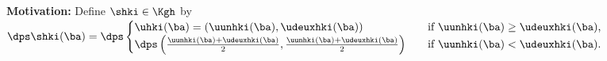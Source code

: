 \documentclass[10 pt]{beamer}
\begin{document}
\begin{frame}
\begin{figure}[H]
\begin{subfigure}[normal]{0.35\textwidth}
\label{ref:lambda_membrane_inside_iter} 
\end{subfigure}
\end{figure}
\vspace{-0.2 cm}
\textcolor{cadmiumgreen}{\textbf{Motivation:}} Define $\shki \in \Kgh$ by
\vspace{0.3 cm}
$\dps \shki (\ba)= \dps \begin{cases}
\uhki(\ba) = \left(\uunhki(\ba), \udeuxhki(\ba)\right) \quad &\mbox{if $\uunhki(\ba) \geq \udeuxhki(\ba)$,}\\
\dps \left(\frac{\uunhki(\ba) + \udeuxhki(\ba)}{2}, \frac{\uunhki(\ba) + \udeuxhki(\ba)}{2}\right) \quad &\mbox{if $\uunhki(\ba) < \udeuxhki(\ba)$.}\end{cases}$
\end{frame}
\end{document}
